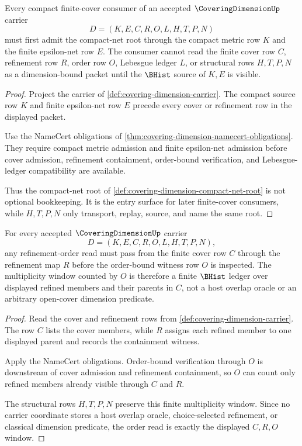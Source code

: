 \begin{theorem}
\label{thm:covering-dimension-compact-net-admission}
Every compact finite-cover consumer of an accepted $\CoveringDimensionUp$ carrier
$$
D=(K,E,C,R,O,L,H,T,P,N)
$$
must first admit the compact-net root through the compact metric row $K$ and the finite epsilon-net row $E$. The consumer cannot read the finite cover row $C$, refinement row $R$, order row $O$, Lebesgue ledger $L$, or structural rows $H,T,P,N$ as a dimension-bound packet until the $\BHist$ source of $K,E$ is visible.
\end{theorem}
\begin{proof}
Project the carrier of \autoref{def:covering-dimension-carrier}. The compact source row $K$ and finite epsilon-net row $E$ precede every cover or refinement row in the displayed packet.

Use the NameCert obligations of \autoref{thm:covering-dimension-namecert-obligations}. They require compact metric admission and finite epsilon-net admission before cover admission, refinement containment, order-bound verification, and Lebesgue-ledger compatibility are available.

Thus the compact-net root of \autoref{def:covering-dimension-compact-net-root} is not optional bookkeeping. It is the entry surface for later finite-cover consumers, while $H,T,P,N$ only transport, replay, source, and name the same root.
\end{proof}

\begin{theorem}
\label{thm:covering-dimension-refinement-multiplicity-window}
For every accepted $\CoveringDimensionUp$ carrier
$$
D=(K,E,C,R,O,L,H,T,P,N),
$$
any refinement-order read must pass from the finite cover row $C$ through the refinement map $R$ before the order-bound witness row $O$ is inspected. The multiplicity window counted by $O$ is therefore a finite $\BHist$ ledger over displayed refined members and their parents in $C$, not a host overlap oracle or an arbitrary open-cover dimension predicate.
\end{theorem}
\begin{proof}
Read the cover and refinement rows from \autoref{def:covering-dimension-carrier}. The row $C$ lists the cover members, while $R$ assigns each refined member to one displayed parent and records the containment witness.

Apply the NameCert obligations. Order-bound verification through $O$ is downstream of cover admission and refinement containment, so $O$ can count only refined members already visible through $C$ and $R$.

The structural rows $H,T,P,N$ preserve this finite multiplicity window. Since no carrier coordinate stores a host overlap oracle, choice-selected refinement, or classical dimension predicate, the order read is exactly the displayed $C,R,O$ window.
\end{proof}

